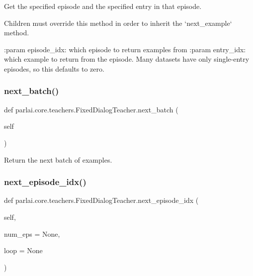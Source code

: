\begin{DoxyVerb}Get the specified episode and the specified entry in that episode.

Children must override this method in order to inherit the
`next_example` method.

:param episode_idx:
    which episode to return examples from
:param entry_idx:
    which example to return from the episode.  Many datasets have only
    single-entry episodes, so this defaults to zero.
\end{DoxyVerb}
 \mbox{\label{classparlai_1_1core_1_1teachers_1_1FixedDialogTeacher_a49100faf9af79c6e24ddac9e36151d54}} 
\subsubsection{\texorpdfstring{next\+\_\+batch()}{next\_batch()}}
{\footnotesize\ttfamily def parlai.\+core.\+teachers.\+Fixed\+Dialog\+Teacher.\+next\+\_\+batch (\begin{DoxyParamCaption}\item[{}]{self }\end{DoxyParamCaption})}

\begin{DoxyVerb}Return the next batch of examples.
\end{DoxyVerb}
 \mbox{\label{classparlai_1_1core_1_1teachers_1_1FixedDialogTeacher_a7fccfc09aef3510f8bb9834398eff8e9}} 
\subsubsection{\texorpdfstring{next\+\_\+episode\+\_\+idx()}{next\_episode\_idx()}}
{\footnotesize\ttfamily def parlai.\+core.\+teachers.\+Fixed\+Dialog\+Teacher.\+next\+\_\+episode\+\_\+idx (\begin{DoxyParamCaption}\item[{}]{self,  }\item[{}]{num\+\_\+eps = {\ttfamily None},  }\item[{}]{loop = {\ttfamily None} }\end{DoxyParamCaption})}

